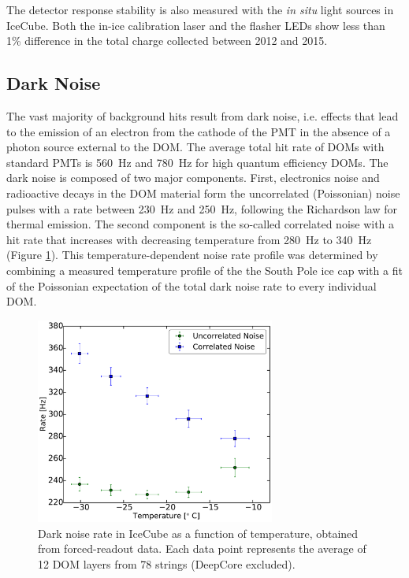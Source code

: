 The detector response stability is also measured with the {\it in
  situ} light sources in IceCube. Both the in-ice calibration laser
\cite{IC3:SC} and the flasher LEDs show less than 1\% difference in the total
charge collected between 2012 and 2015. 

\subsection{\label{sect:darknoise}Dark Noise}

The vast majority of background hits result from dark noise, i.e. effects
that lead to the emission of an electron from the cathode of the PMT in the
absence of a photon source external to the DOM. The average total hit rate of
DOMs with standard PMTs is \SI{560}{\hertz} and \SI{780}{\hertz} for high
quantum efficiency DOMs.  The dark noise is composed of two major 
components.  First, electronics noise and radioactive decays in the DOM material form
the uncorrelated (Poissonian) noise pulses with a rate between
\SI{230}{\hertz} and \SI{250}{\hertz}, following the Richardson law for
thermal emission.  The second component is the so-called correlated
noise with a hit rate that increases with decreasing temperature from
\SI{280}{\hertz} to \SI{340}{\hertz} (Figure
\ref{fig:dom_darknoise_vs_temperature}).  This temperature-dependent noise
rate profile was determined by combining a measured temperature profile of
the the South Pole ice cap \cite{price2002temperature} with a fit of the
Poissonian expectation of the total dark noise rate to every individual
DOM.

\begin{figure}
  \centering
  \includegraphics[width=0.7\textwidth]{graphics/dom/performance/darknoise/HitRatevsTemp_inice_nomuons_nofit_bigfont.pdf}
  \caption{Dark noise rate in IceCube as a function of temperature, obtained from forced-readout
    data. Each data point represents the average of 12 DOM layers from 78 strings (DeepCore excluded).}
  \label{fig:dom_darknoise_vs_temperature}
\end{figure}

